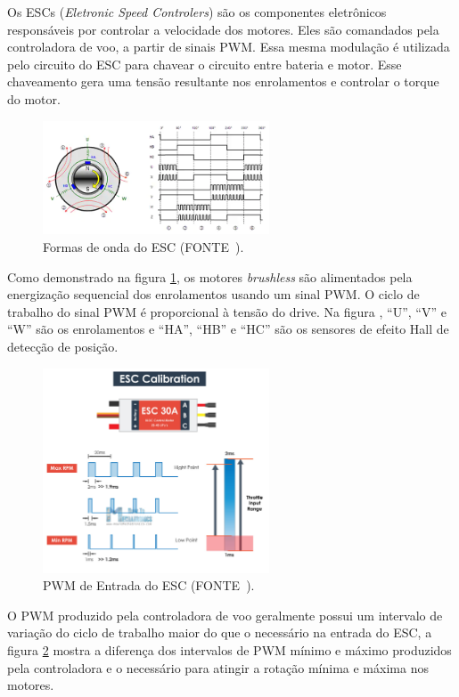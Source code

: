 \documentclass[12pt,a4paper,oneside]{book}
\begin{document}
Os ESCs (\textit{Eletronic Speed Controlers}) são os componentes eletrônicos responsáveis por controlar a velocidade dos motores. Eles são comandados pela controladora de voo, a partir de sinais PWM. Essa mesma modulação é utilizada pelo circuito do ESC para chavear o circuito entre bateria e motor. Esse chaveamento gera uma tensão resultante nos enrolamentos e  controlar o torque do motor. 
%
\begin{figure}[H]
  \centering
  \includegraphics[width=0.6\textwidth]{Images/introducao/esc_wave_form.png}
  \caption{Formas de onda do ESC (FONTE~\cite{url:esc_wave_form}).}
  \label{fig:esc_wave_form.png.0}
\end{figure}
%
Como demonstrado na figura \ref{fig:esc_wave_form.png.0}, os motores \textit{brushless} são alimentados pela energização sequencial dos enrolamentos usando um sinal PWM. O ciclo de trabalho do sinal PWM é proporcional à tensão do drive. Na figura , “U”, “V” e “W” são os enrolamentos e “HA”, “HB” e “HC” são os sensores de efeito Hall de detecção de posição.
%
\begin{figure}[H]
  \centering
  \includegraphics[width=0.6\textwidth]{Images/introducao/esc_pwm.jpg}
  \caption{PWM de Entrada do ESC (FONTE~\cite{url:esc_pwm}).}
  \label{fig:esc_pwm.jpg.0}
\end{figure}
%
O PWM produzido pela controladora de voo geralmente possui um intervalo de variação do ciclo de trabalho maior do que o necessário na entrada do ESC, a figura \ref{fig:esc_pwm.jpg.0} mostra a diferença dos intervalos de PWM mínimo e máximo produzidos pela controladora e o necessário para atingir a rotação mínima e máxima nos motores.
\end{document}
